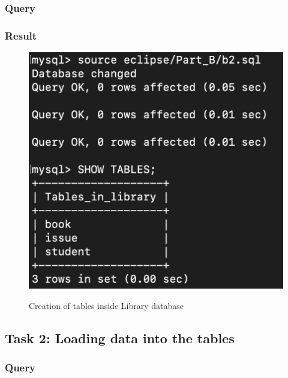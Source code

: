 \documentclass[12pt]{article}
\begin{document}
\subsubsection*{Query}

\newpage

\subsubsection*{Result}
\begin{figure}[!hbt]
    \centering
    \includegraphics[scale=0.8]{screenshots/b1_02.png}
    \label{fig:my_label1}
    \caption{Creation of tables inside Library database}
\end{figure}

\newpage


\subsection{Task 2: Loading data into the tables}

\subsubsection{Query}
\end{document}
